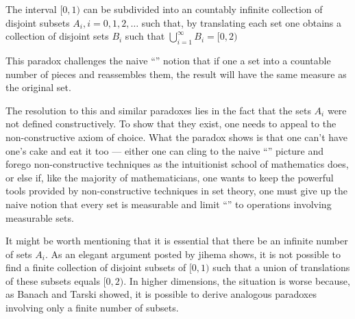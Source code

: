 \documentclass[12pt]{article}
\begin{document}
The interval $[0,1)$ can be subdivided into an countably infinite collection of disjoint subsets $A_i, i = 0,1,2,\ldots$ such that, by translating each set one obtains a collection of disjoint sets $B_i$ such that $\bigcup_{i=1}^\infty B_i = [0,2)$

This paradox challenges the naive ``'' notion that if one  a set into a countable number of pieces and reassembles them, the result will have the same measure as the original set.

The resolution to this and similar paradoxes lies in the fact that the sets $A_i$ were not defined constructively.  To show that they exist, one needs to appeal to the non-constructive axiom of choice.  What the paradox shows is that one can't have one's cake and eat it too --- either one can cling to the naive ``'' picture and forego non-constructive techniques as the intuitionist school of mathematics does, or else if, like the majority of mathematicians, one wants to keep the powerful tools provided by non-constructive techniques in set theory, one must give up the naive notion that every set is measurable and limit ``'' to operations involving measurable sets.

It might be worth mentioning that it is essential that there be an infinite number of sets $A_i$.  As an elegant argument posted by jihema shows, it is not possible to find a finite collection of disjoint subsets of $[0,1)$ such that a union of translations of these subsets equals $[0,2)$.  In higher dimensions, the situation is worse because, as Banach and Tarski showed, it is possible to derive analogous paradoxes involving only a finite number of subsets.
\end{document}
